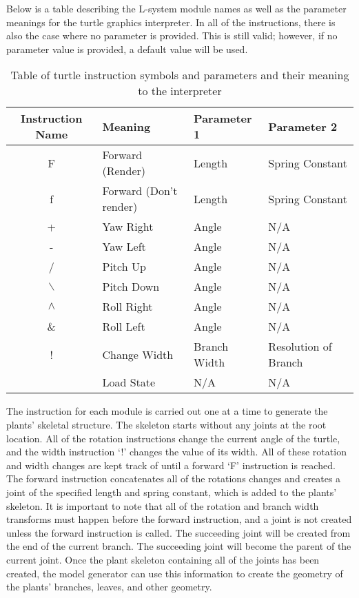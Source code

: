 Below is a table describing the L-system module names as well as the parameter meanings for the turtle graphics interpreter. In all of the instructions, there is also the case where no parameter is provided. This is still valid; however, if no parameter value is provided, a default value will be used.

\begin{table}[h!]
\centering
\begin{tabular}{ | c | l | l | l |}
\hline
	Instruction Name  & Meaning					& Parameter 1 	& Parameter 2 					\\  
\hline
\hline
	F 				&	Forward (Render)		& Length		& Spring Constant				\\
\hline
	f 				&	Forward (Don't render)	& Length 		& Spring Constant				\\
\hline
	+ 				&	Yaw	Right				& Angle 		&	N/A							\\
\hline
	- 				&	Yaw Left				& Angle			&	N/A							\\
\hline
	/ 				&	Pitch Up				& Angle			&	N/A							\\
\hline
	$\backslash$ 	&	Pitch Down				& Angle			&	N/A							\\
\hline
	$\land$ 		&	Roll Right				& Angle			&	N/A							\\
\hline
	\& 				&	Roll Left				& Angle 		&	N/A							\\
\hline
	! 				&	Change Width			& Branch Width	&	Resolution of Branch		\\
\hline
	[ 				&	Save State				& N/A			&	N/A							\\
\hline
	] 				&	Load State				& N/A 			&	N/A							\\
\hline
\end{tabular}
\caption{Table of turtle instruction symbols and parameters and their meaning to the interpreter}
\label{instruction table 1}
\end{table}
\FloatBarrier

\noindent
The instruction for each module is carried out one at a time to generate the plants' skeletal structure. The skeleton starts without any joints at the root location. All of the rotation instructions change the current angle of the turtle, and the width instruction `!' changes the value of its width. All of these rotation and width changes are kept track of until a forward `F' instruction is reached. The forward instruction concatenates all of the rotations changes and creates a joint of the specified length and spring constant, which is added to the plants' skeleton. It is important to note that all of the rotation and branch width transforms must happen before the forward instruction, and a joint is not created unless the forward instruction is called. The succeeding joint will be created from the end of the current branch. The succeeding joint will become the parent of the current joint. Once the plant skeleton containing all of the joints has been created, the model generator can use this information to create the geometry of the plants' branches, leaves, and other geometry.

